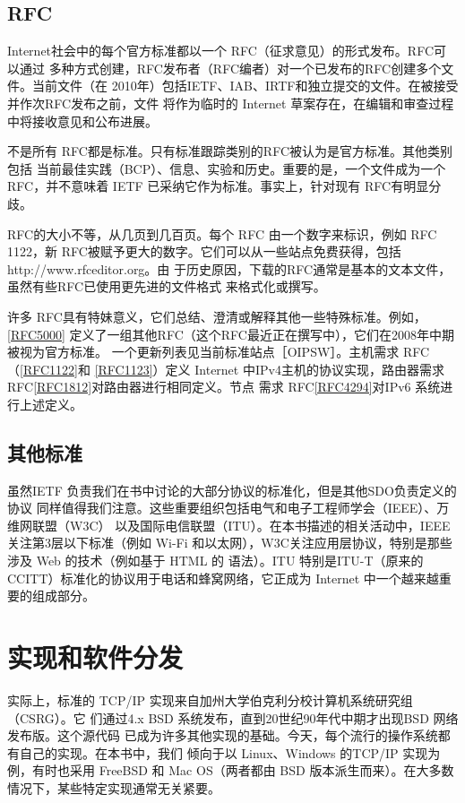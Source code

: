 \subsection{RFC}
Internet社会中的每个官方标准都以一个 RFC（征求意见）的形式发布。RFC可以通过
多种方式创建，RFC发布者（RFC编者）对一个已发布的RFC创建多个文件。当前文件（在
2010年）包括IETF、IAB、IRTF和独立提交的文件。在被接受并作次RFC发布之前，文件
将作为临时的 Internet 草案存在，在编辑和审查过程中将接收意见和公布进展。

不是所有 RFC都是标准。只有标准跟踪类别的RFC被认为是官方标准。其他类别包括
当前最佳实践（BCP）、信息、实验和历史。重要的是，一个文件成为一个 RFC，并不意味着
IETF 已采纳它作为标准。事实上，针对现有 RFC有明显分歧。

RFC的大小不等，从几页到几百页。每个 RFC 由一个数字来标识，例如 RFC 1122，新
RFC被赋予更大的数字。它们可以从一些站点免费获得，包括 http://www.rfceditor.org。由
于历史原因，下载的RFC通常是基本的文本文件，虽然有些RFC已使用更先进的文件格式
来格式化或撰写。

许多
RFC具有特妹意义，它们总结、澄清或解释其他一些特殊标准。例如，\href{https://www.rfc-editor.org/rfc/rfc5000}{[RFC5000]}
定义了一组其他RFC（这个RFC最近正在撰写中），它们在2008年中期被视为官方标准。
一个更新列表见当前标准站点［OIPSW］。主机需求
RFC（\href{https://www.rfc-editor.org/rfc/rfc1122}{[RFC1122]}和
\href{https://www.rfc-editor.org/rfc/rfc1123}{[RFC1123]}）定义
Internet 中IPv4主机的协议实现，路由器需求
RFC\href{https://www.rfc-editor.org/rfc/rfc1812}{[RFC1812]}对路由器进行相同定义。节点
需求 RFC\href{https://www.rfc-editor.org/rfc/rfc4294}{[RFC4294]}对IPv6 系统进行上述定义。
\subsection{其他标准}
虽然IETF 负责我们在书中讨论的大部分协议的标准化，但是其他SDO负责定义的协议
同样值得我们注意。这些重要组织包括电气和电子工程师学会（IEEE）、万维网联盟（W3C）
以及国际电信联盟（ITU）。在本书描述的相关活动中，IEEE 关注第3层以下标准（例如
Wi-Fi 和以太网），W3C关注应用层协议，特别是那些涉及 Web 的技术（例如基于 HTML 的
语法）。ITU 特别是ITU-T（原来的CCITT）标准化的协议用于电话和蜂窝网络，它正成为
Internet 中一个越来越重要的组成部分。

\section{实现和软件分发}
实际上，标准的 TCP/IP 实现来自加州大学伯克利分校计算机系统研究组（CSRG）。它
们通过4.x BSD 系统发布，直到20世纪90年代中期才出现BSD 网络发布版。这个源代码
已成为许多其他实现的基础。今天，每个流行的操作系统都有自己的实现。在本书中，我们
倾向于以 Linux、Windows 的TCP/IP 实现为例，有时也采用 FreeBSD 和 Mac OS（两者都由
BSD 版本派生而来）。在大多数情况下，某些特定实现通常无关紧要。

